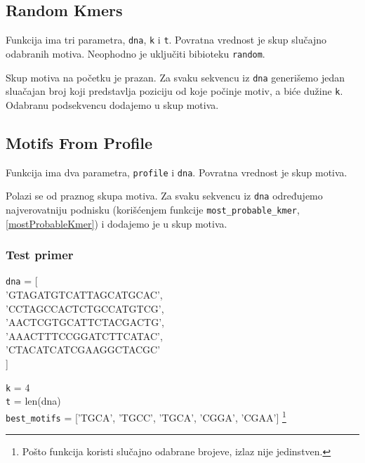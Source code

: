 

\subsection{Random Kmers}
\label{randomKmers}

Funkcija ima tri parametra, \texttt{dna}, \texttt{k} i \texttt{t}. Povratna vrednost je skup slučajno odabranih motiva. Neophodno je uključiti bibioteku \texttt{random}.

Skup motiva na početku je prazan. Za svaku sekvencu iz \texttt{dna} generišemo jedan sluačajan broj koji predstavlja poziciju od koje počinje motiv, a biće dužine \texttt{k}. Odabranu podsekvencu dodajemo u skup motiva.
\newpage


\subsection{Motifs From Profile}
\label{motifsFromProfile}

Funkcija ima dva parametra, \texttt{profile} i \texttt{dna}. Povratna vrednost je skup motiva.

Polazi se od praznog skupa motiva. Za svaku sekvencu iz \texttt{dna} određujemo najverovatniju podnisku (korišćenjem funkcije \texttt{most\_probable\_kmer}, \ref{mostProbableKmer}) i dodajemo je u skup motiva.



\subsubsection{Test primer}
\noindent\texttt{dna} = [ \\
\indent'GTAGATGTCATTAGCATGCAC', \\
\indent'CCTAGCCACTCTGCCATGTCG', \\
\indent'AACTCGTGCATTCTACGACTG', \\
\indent'AAACTTTCCGGATCTTCATAC', \\
\indent'CTACATCATCGAAGGCTACGC' \\
]

\noindent \texttt{k} = 4
\\\texttt{t} = len(dna)
\\\texttt{best\_motifs} = ['TGCA', 'TGCC', 'TGCA', 'CGGA', 'CGAA'] \footnote{Pošto funkcija koristi slučajno odabrane brojeve, izlaz nije jedinstven.}


